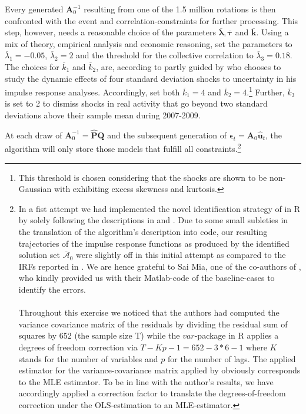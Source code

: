 \documentclass[a4paper,11pt,listof=nochaptergap,oneside,pointednumbers,bibtotoc,bigheadings,liststotoc,hidelinks]{scrbook}
\theoremstyle{mysatz}
\theoremstyle{mydefinition}
\theoremstyle{mytheorem}
\theoremstyle{mybemerkung}
\let\oldhat\hat
\newcommand{\vect}[1]{\boldsymbol{\mathbf{#1}}}
\newcommand{\hatt}[1]{\oldhat{\boldsymbol{\mathbf{#1}}}}
\begin{document}
Every generated $\vect{A}_0^{-1}$ resulting from one of the 1.5 million rotations is then confronted with the event and correlation-constraints for further processing. This step, however, needs a reasonable choice of the parameters $\overline{\vect{\lambda}}, \overline{\vect{\tau}}$ and $\overline{\vect{k}}$. Using a mix of theory, empirical analysis and economic reasoning, \citet{ludvigsonetal:18} set the parameters to  $\overline{\lambda}_1 = -0.05$, $\overline{\lambda}_2 = 2$ and the threshold for the collective correlation to $\overline{\lambda}_3 = 0.18$. The choices for $\overline{k}_1$ and $\overline{k}_2$, are, according to \citet{ludvigsonetal:18} partly guided by \citet{bloom:09} who chooses to study the dynamic effects of four standard deviation shocks to uncertainty in his impulse response analyses. Accordingly, \citet{ludvigsonetal:18} set both $\overline{k}_1 = 4$ and $\overline{k}_2 = 4$.\footnote{This threshold is chosen considering that the shocks are shown to be non-Gaussian with exhibiting excess skewness and kurtosis.} Further, $\overline{k}_3$ is set to 2 to dismiss shocks in real activity that go beyond two standard deviations above their sample mean during 2007-2009.

At each draw of $\vect{A}_0^{-1} = \hatt{\vect{P}}\vect{Q}$ and the subsequent generation of $\vect{\epsilon}_t = \vect{A}_0\hatt{\vect{u}}_t$, the algorithm will only store those models that fulfill all constraints.\footnote{In a fist attempt we had implemented the novel identification strategy of \citet{ludvigsonetal:18} in R by solely following the descriptions in \citet{ludvigsonetal:18} and \citet{ludvigsonetal:17}. Due to some small subleties in the translation of the algorithm's description into code, our resulting trajectories of the impulse response functions as produced by the identified solution set $\overline{\vect{\mathcal{A}}}_0$ were slightly off in this initial attempt as compared to the IRFs reported in \citet{ludvigsonetal:18}. We are hence grateful to Sai Mia, one of the co-authors of \citet{ludvigsonetal:18}, who kindly provided us with their Matlab-code of the baseline-cases to identify the errors.\\
\\
Throughout this exercise we noticed that the authors had computed the variance covariance matrix of the residuals by dividing the residual sum of squares by 652 (the sample size T) while the $var$-package in R applies a degrees of freedom correction via $T-Kp-1 = 652 - 3*6 - 1$ where $K$ stands for the number of variables and $p$ for the number of lags. The applied estimator for the variance-covariance matrix applied by \citet{ludvigsonetal:18} obviously corresponds to the MLE estimator. To be in line with the author's results, we have accordingly applied a correction factor to translate the degrees-of-freedom correction under the OLS-estimation to an MLE-estimator.\label{ftn:MatlabCodeFootnote}}
\end{document}
